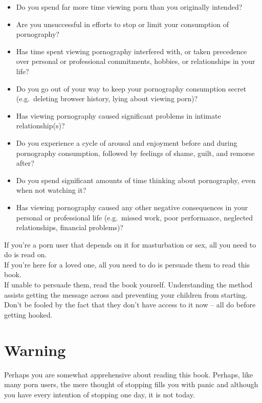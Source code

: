\documentclass[
]{book}
\begin{document}
\begin{itemize}
\item
  Do you spend far more time viewing porn than you originally intended?
\item
  Are you unsuccessful in efforts to stop or limit your consumption of pornography?
\item
  Has time spent viewing pornography interfered with, or taken precedence over personal or professional commitments, hobbies, or relationships in your life?
\item
  Do you go out of your way to keep your pornography consumption secret (e.g.~deleting browser history, lying about viewing porn)?
\item
  Has viewing pornography caused significant problems in intimate relationship(s)?
\item
  Do you experience a cycle of arousal and enjoyment before and during pornography consumption, followed by feelings of shame, guilt, and remorse after?
\item
  Do you spend significant amounts of time thinking about pornography, even when not watching it?
\item
  Has viewing pornography caused any other negative consequences in your personal or professional life (e.g.~missed work, poor performance, neglected relationships, financial problems)?
\end{itemize}

If you're a porn user that depends on it for masturbation or sex, all you need to do is read on.\\
If you're here for a loved one, all you need to do is persuade them to read this book.\\
If unable to persuade them, read the book yourself. Understanding the method assists getting the message across and preventing your children from starting. Don't be fooled by the fact that they don't have access to it now -- all do before getting hooked.

\hypertarget{warning}{%
\section*{Warning}\label{warning}}

Perhaps you are somewhat apprehensive about reading this book. Perhaps, like many porn users, the mere thought of stopping fills you with panic and although you have every intention of stopping one day, it is not today.
\end{document}
